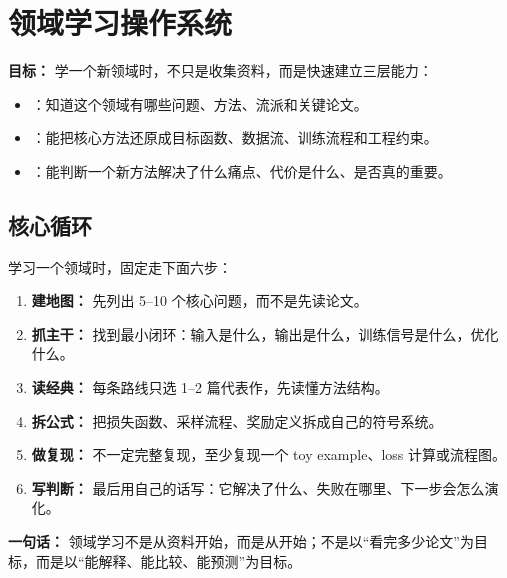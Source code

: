 
\section{领域学习操作系统}

\begin{conceptbox}
\textbf{目标：} 学一个新领域时，不只是收集资料，而是快速建立三层能力：
\begin{itemize}[leftmargin=1.5em]
  \item {}：知道这个领域有哪些问题、方法、流派和关键论文。
  \item {}：能把核心方法还原成目标函数、数据流、训练流程和工程约束。
  \item {}：能判断一个新方法解决了什么痛点、代价是什么、是否真的重要。
\end{itemize}
\end{conceptbox}

\subsection{核心循环}

学习一个领域时，固定走下面六步：

\begin{enumerate}[leftmargin=1.5em]
  \item \textbf{建地图：} 先列出 5--10 个核心问题，而不是先读论文。
  \item \textbf{抓主干：} 找到最小闭环：输入是什么，输出是什么，训练信号是什么，优化什么。
  \item \textbf{读经典：} 每条路线只选 1--2 篇代表作，先读懂方法结构。
  \item \textbf{拆公式：} 把损失函数、采样流程、奖励定义拆成自己的符号系统。
  \item \textbf{做复现：} 不一定完整复现，至少复现一个 toy example、loss 计算或流程图。
  \item \textbf{写判断：} 最后用自己的话写：它解决了什么、失败在哪里、下一步会怎么演化。
\end{enumerate}

\begin{summarybox}
\textbf{一句话：} 领域学习不是从资料开始，而是从开始；不是以“看完多少论文”为目标，而是以“能解释、能比较、能预测”为目标。
\end{summarybox}

